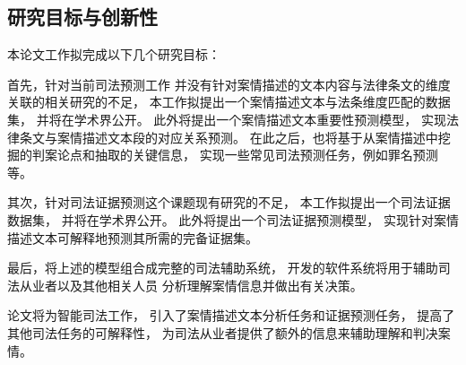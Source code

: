 \subsection{研究目标与创新性}
本论文工作拟完成以下几个研究目标：

首先，针对当前司法预测工作
并没有针对案情描述的文本内容与法律条文的维度关联的相关研究的不足，
本工作拟提出一个案情描述文本与法条维度匹配的数据集，
并将在学术界公开。
此外将提出一个案情描述文本重要性预测模型，
实现法律条文与案情描述文本段的对应关系预测。
在此之后，也将基于从案情描述中挖掘的判案论点和抽取的关键信息，
实现一些常见司法预测任务，例如罪名预测等。

其次，针对司法证据预测这个课题现有研究的不足，
本工作拟提出一个司法证据数据集，
并将在学术界公开。
此外将提出一个司法证据预测模型，
实现针对案情描述文本可解释地预测其所需的完备证据集。

最后，将上述的模型组合成完整的司法辅助系统，
开发的软件系统将用于辅助司法从业者以及其他相关人员
分析理解案情信息并做出有关决策。

论文将为智能司法工作，
引入了案情描述文本分析任务和证据预测任务，
提高了其他司法任务的可解释性，
为司法从业者提供了额外的信息来辅助理解和判决案情。


